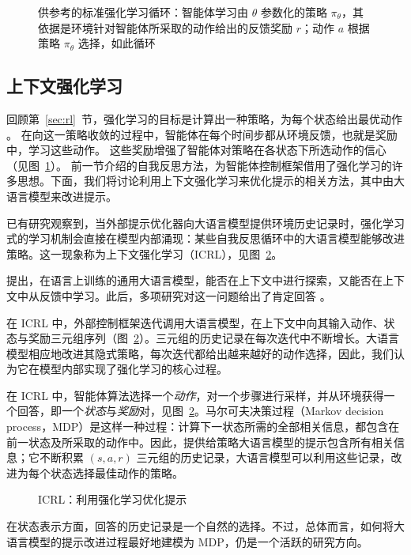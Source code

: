 \begin{figure}
  \begin{center}
    
    \caption{供参考的标准强化学习循环：智能体学习由 $\theta$ 参数化的策略 $\pi_\theta$，其依据是环境针对智能体所采取的动作给出的反馈奖励 $r$；动作 $a$ 根据策略 $\pi_\theta$ 选择，如此循环 \citep{sutton2018reinforcement}}\label{fig:rl6}
  \end{center}
\end{figure}


\subsection{上下文强化学习}\label{sec:icrl}
回顾第~\ref{sec:rl}~节，强化学习的目标是计算出一种策略，为每个状态给出最优动作 \citep{sutton2018reinforcement}。
在向这一策略收敛的过程中，智能体在每个时间步都从环境反馈，也就是奖励中，学习这些动作。
这些奖励增强了智能体对策略在各状态下所选动作的信心（见图~\ref{fig:rl6}）。
前一节介绍的自我反思方法，为智能体控制框架借用了强化学习的许多思想。下面，我们将讨论利用上下文强化学习来优化提示的相关方法，其中由大语言模型来改进提示。





已有研究观察到，当外部提示优化器向大语言模型提供环境历史记录时，强化学习式的学习机制会直接在模型内部涌现：某些自我反思循环中的大语言模型能够改进策略。这一现象称为上下文强化学习（ICRL）\citep{song2025reward}，见图~\ref{fig:rl-icrl}。


\citet{krishnamurthy2024can} 提出，在语言上训练的通用大语言模型，能否在上下文中进行探索，又能否在上下文中从反馈中学习。此后，多项研究对这一问题给出了肯定回答 \citep{demircan2024sparse,song2025reward,moeini2025survey,monea2024llms,nie2024evolve,wang2024transformers}。

在 ICRL 中，外部控制框架迭代调用大语言模型，在上下文中向其输入动作、状态与奖励三元组序列（图~\ref{fig:rl-icrl}）。三元组的历史记录在每次迭代中不断增长。大语言模型相应地改进其隐式策略，每次迭代都给出越来越好的动作选择，因此，我们认为它在模型内部实现了强化学习的核心过程。

在 ICRL 中，智能体算法选择一个{\em 动作}，对一个步骤进行采样，并从环境获得一个回答，即一个{\em 状态}与{\em 奖励}对，见图~\ref{fig:rl-icrl}。马尔可夫决策过程（Markov decision process，MDP）是这样一种过程：计算下一状态所需的全部相关信息，都包含在前一状态及所采取的动作中。因此，提供给策略大语言模型的提示包含所有相关信息；它不断积累 $(s,a,r)$ 三元组的历史记录，大语言模型可以利用这些记录，改进为每个状态选择最佳动作的策略。
\begin{figure}[t]
  \begin{center}
    
    \caption{ICRL：利用强化学习优化提示}\label{fig:rl-icrl}
  \end{center}
\end{figure}
在状态表示方面，回答的历史记录是一个自然的选择。不过，总体而言，如何将大语言模型的提示改进过程最好地建模为 MDP，仍是一个活跃的研究方向。

